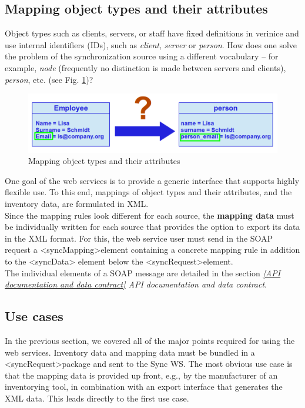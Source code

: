 \documentclass[a4paper,10pt]{book}
\begin{document}
\subsection{Mapping object types and their attributes}
Object types such as clients, servers, or staff have fixed definitions in verinice and use internal identifiers (IDs), such
as {\em client}, {\em server} or {\em person}. How does one solve the problem of the synchronization source using a different vocabulary –
for example, {\em node} (frequently no distinction is made between servers and clients), {\em person}, etc. (see Fig. \ref{Mapping object types and their attributes})?
\newline
\begin{figure}[htb!]
  \centering
  \includegraphics[scale=.36]{Screenshot/Mapping_Attributtypen-en.png}
  \caption{\label{Mapping object types and their attributes} Mapping object types and their attributes}
\end{figure}
\newline
One goal of the web services is to provide a generic interface that supports highly flexible use. To this end, mappings of object types and their
attributes, and the inventory data, are formulated in XML.
\newline\\
Since the mapping rules look different for each source, the \textbf{mapping data} must be individually written for each source that provides the
option to export its data in the XML format. For this, the web service user must send in the SOAP request a
\textless syncMapping\textgreater element containing a concrete mapping rule in addition to the \textless syncData\textgreater
element below the \textless syncRequest\textgreater element.
\newline\\
The individual elements of a SOAP message are detailed in the section {\em\ref{API documentation and data contract} API documentation and data contract}.

\subsection{Use cases}
In the previous section, we covered all of the major points required for using the web services. Inventory data and
mapping data must be bundled in a \textless syncRequest\textgreater package and sent to the Sync WS.
The most obvious use case is that the mapping data is provided up front, e.g., by the manufacturer of an
inventorying tool, in combination with an export interface that generates the XML data. This leads directly
to the first use case.
\newline\\
\end{document}
